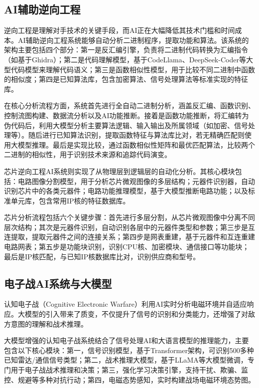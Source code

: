 \subsection{AI辅助逆向工程}

逆向工程是理解对手技术的关键手段，而AI正在大幅降低其技术门槛和时间成本。AI辅助逆向工程系统能够自动分析二进制程序，提取功能和算法。该系统的架构主要包括四个部分：第一是反汇编引擎，负责将二进制代码转换为汇编指令（如基于Ghidra）；第二是代码理解模型，基于CodeLlama、DeepSeek-Coder等大型代码模型来理解代码语义；第三是函数相似性模型，用于比较不同二进制中函数的相似度；第四是已知算法库，包含加密算法、信号处理算法等标准实现的特征库。

在核心分析流程方面，系统首先进行全自动二进制分析，涵盖反汇编、函数识别、控制流图构建、数据流分析以及AI功能推断。接着是函数功能推断，将汇编转为伪代码后，利用大模型分析主要算法逻辑、输入输出及所属领域（如加密、信号处理等）。随后进行已知算法识别，提取函数特征与算法库比对，若无精确匹配则使用大模型推理。最后是实现比较，通过函数相似性矩阵和最优匹配算法，比较两个二进制的相似性，用于识别技术来源和追踪代码演变。

芯片逆向工程AI系统则实现了从物理层到逻辑层的自动化分析。其核心模块包括：电路图像分割模型，用于分析芯片微观图像的多层结构；元器件识别器，自动识别芯片中的各类元器件；电路功能推理模型，基于大模型推断电路功能；以及标准单元库，包含常用IP核的特征数据库。

芯片分析流程包括六个关键步骤：首先进行多层分割，从芯片微观图像中分离不同层次结构；其次是元器件识别，自动识别各层中的元器件类型和参数；第三步是互连提取，提取元器件之间的连接关系；第四步是网表重建，基于元器件和互连重建电路网表；第五步是功能块识别，识别CPU核、加密模块、通信接口等功能块；最后是IP核匹配，与已知IP核数据库比对，识别供应商和型号。

\subsection{电子战AI系统与大模型}

认知电子战（Cognitive Electronic Warfare）利用AI实时分析电磁环境并自适应响应。大模型的引入带来了质变，不仅提升了信号的识别和分类能力，还增强了对敌方意图的理解和战术推理。

大模型增强的认知电子战系统结合了信号处理AI和大语言模型的推理能力，主要包含以下核心模块：第一，信号识别模型，基于Transformer架构，可识别500多种已知雷达/通信信号类型；第二，战术推理大模型，基于LLaMA等大模型微调，专门用于电子战战术推理和决策；第三，强化学习决策引擎，支持干扰、欺骗、监控、规避等多种对抗行动；第四，电磁态势感知，实时构建战场电磁环境态势图。

